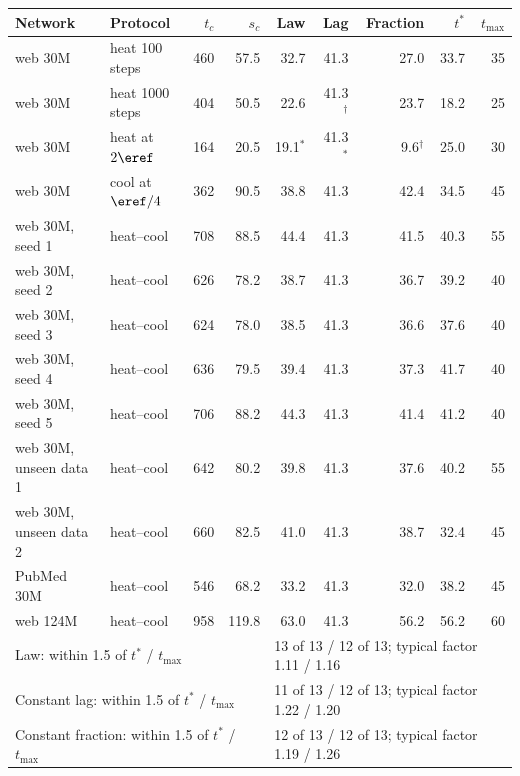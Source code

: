 \begin{tabular}{llrrrrrrr}
\toprule
Network & Protocol & $t_c$ & $s_c$ & Law & Lag & Fraction & $t^*$ & $t_{\max}$\\
\midrule
web 30M & heat 100 steps & 460 & 57.5 & 32.7 & 41.3 & 27.0 & 33.7 & 35\\
web 30M & heat 1000 steps & 404 & 50.5 & 22.6 & 41.3$^{\dagger}$ & 23.7 & 18.2 & 25\\
web 30M & heat at $2\eref$ & 164 & 20.5 & 19.1$^{*}$ & 41.3$^{*}$ & 9.6$^{\dagger}$ & 25.0 & 30\\
web 30M & cool at $\eref/4$ & 362 & 90.5 & 38.8 & 41.3 & 42.4 & 34.5 & 45\\
web 30M, seed 1 & heat--cool & 708 & 88.5 & 44.4 & 41.3 & 41.5 & 40.3 & 55\\
web 30M, seed 2 & heat--cool & 626 & 78.2 & 38.7 & 41.3 & 36.7 & 39.2 & 40\\
web 30M, seed 3 & heat--cool & 624 & 78.0 & 38.5 & 41.3 & 36.6 & 37.6 & 40\\
web 30M, seed 4 & heat--cool & 636 & 79.5 & 39.4 & 41.3 & 37.3 & 41.7 & 40\\
web 30M, seed 5 & heat--cool & 706 & 88.2 & 44.3 & 41.3 & 41.4 & 41.2 & 40\\
web 30M, unseen data 1 & heat--cool & 642 & 80.2 & 39.8 & 41.3 & 37.6 & 40.2 & 55\\
web 30M, unseen data 2 & heat--cool & 660 & 82.5 & 41.0 & 41.3 & 38.7 & 32.4 & 45\\
PubMed 30M & heat--cool & 546 & 68.2 & 33.2 & 41.3 & 32.0 & 38.2 & 45\\
web 124M & heat--cool & 958 & 119.8 & 63.0 & 41.3 & 56.2 & 56.2 & 60\\
\midrule
\multicolumn{4}{l}{Law: within 1.5 of $t^*$ / $t_{\max}$} & \multicolumn{5}{l}{13 of 13 / 12 of 13; typical factor 1.11 / 1.16}\\
\multicolumn{4}{l}{Constant lag: within 1.5 of $t^*$ / $t_{\max}$} & \multicolumn{5}{l}{11 of 13 / 12 of 13; typical factor 1.22 / 1.20}\\
\multicolumn{4}{l}{Constant fraction: within 1.5 of $t^*$ / $t_{\max}$} & \multicolumn{5}{l}{12 of 13 / 12 of 13; typical factor 1.19 / 1.26}\\
\bottomrule
\end{tabular}

